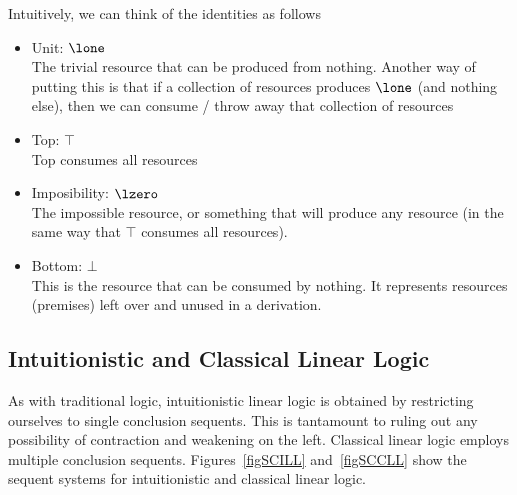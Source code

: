 Intuitively, we can think of the identities as follows
\begin{itemize}
\item Unit: $\lone$\\
The trivial resource that can
be produced from nothing.  Another way of putting this is that if
a collection of resources produces $\lone$ (and nothing else), then we
can consume / throw away that collection of resources
\item Top: $\top$\\
Top consumes all resources
\item Imposibility: $\lzero$\\
The impossible resource, or something that will produce any resource (in the
same way that $\top$ consumes all resources).
\item Bottom: $\bot$\\
This is the resource that can be consumed by nothing.  It represents
resources (premises) left over and unused in a derivation.
\end{itemize}

\subsection{Intuitionistic and Classical Linear Logic}

As with traditional logic, intuitionistic linear logic is obtained by
restricting ourselves to single conclusion sequents.  This is tantamount
to ruling out any possibility of contraction and weakening on the
left. Classical linear logic employs multiple conclusion sequents.
Figures~\ref{figSCILL} and~\ref{figSCCLL} show the
sequent systems for intuitionistic and classical linear logic.


